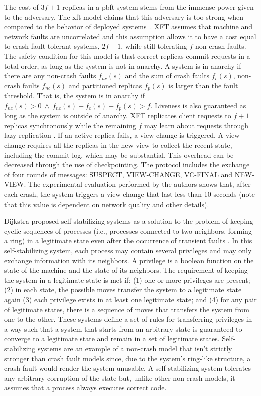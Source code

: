 The cost of $3f+1$ replicas in a \acrshort{pbft} system stems from the immense power given to the adversary. The \acrfull{xft} model claims that this adversary is too strong when compared to the behavior of deployed systems~\cite{Liu2015,Porto2015}. XFT assumes that machine and network faults are uncorrelated and this assumption allows it to have a cost equal to crash fault tolerant systems, $2f+1$, while still tolerating $f$ non-crash faults. The safety condition for this model is that correct replicas commit requests in a total order, as long as the system is not in anarchy. A system is in anarchy if there are any non-crash faults $f_{nc}(s)$ and the sum of crash faults $f_c(s)$, non-crash faults $f_{nc}(s)$ and partitioned replicas $f_p(s)$ is larger than the fault threshold. That is, the system is in anarchy if $f_{nc}(s) > 0\ \land\ f_{nc}(s)+ f_c(s)+f_p(s) > f$. Liveness is also guaranteed as long as the system is outside of anarchy. XFT replicates client requests to $f+1$ replicas synchronously while the remaining $f$ may learn about requests through lazy replication \cite{Ladin1992}. If an active replica fails, a view change is triggered. A view change requires all the replicas in the new view to collect the recent state, including the commit log, which may be substantial. This overhead can be decreased through the use of checkpointing. The protocol includes the exchange of four rounds of messages: SUSPECT, VIEW-CHANGE, VC-FINAL and NEW-VIEW. The experimental evaluation performed by the authors shows that, after each crash, the system triggers a view change that last less than 10 seconds (note that this value is dependent on network quality and other details). \par
Dijkstra proposed self-stabilizing systems as a solution to the problem of keeping cyclic sequences of processes (i.e., processes connected to two neighbors, forming a ring) in a legitimate state even after the occurrence of transient faults \cite{Dijkstra1974}. In this self-stabilizing system, each process may contain several privileges and may only exchange information with its neighbors. A privilege is a boolean function on the state of the machine and the state of its neighbors. The requirement of keeping the system in a legitimate state is met if: (1) one or more privileges are present; (2) in each state, the possible moves transfer the system to a legitimate state again (3) each privilege exists in at least one legitimate state; and (4) for any pair of legitimate states, there is a sequence of moves that transfers the system from one to the other. These systems define a set of rules for transferring privileges in a way such that a system that starts from an arbitrary state is guaranteed to converge to a legitimate state and remain in a set of legitimate states. Self-stabilizing systems are an example of a non-crash model that isn't strictly stronger than crash fault models since, due to the system's ring-like structure, a crash fault would render the system unusable. A self-stabilizing system tolerates any arbitrary corruption of the state but, unlike other non-crash models, it assumes that a process always executes correct code.\par
